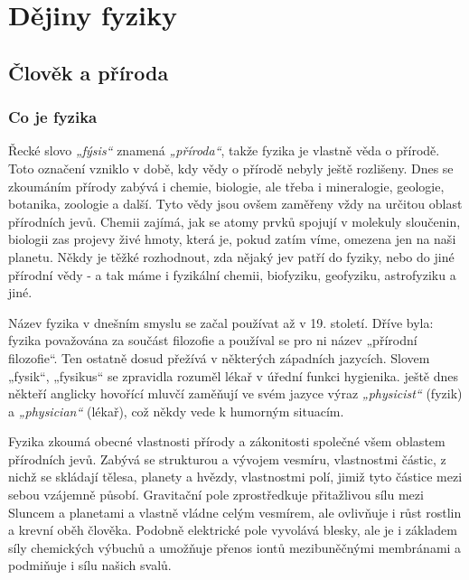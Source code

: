 \setchaptertoc
\chapter{Dějiny fyziky}\label{fyz:IchapII} 
  \section{Člověk a příroda}
    \subsection{Co je fyzika}
      Řecké slovo \emph{„fýsis“} znamená \emph{„příroda“}, takže fyzika je vlastně věda o přírodě.
      Toto označení vzniklo v době, kdy vědy o přírodě nebyly ještě rozlišeny. Dnes se zkoumáním
      přírody zabývá i chemie, biologie, ale třeba i mineralogie, geologie, botanika, zoologie a
      další. Tyto vědy jsou ovšem zaměřeny vždy na určitou oblast přírodních jevů. Chemii zajímá,
      jak se atomy prvků spojují v molekuly sloučenin, biologii zas projevy živé hmoty, která je,
      pokud zatím víme, omezena jen na naši planetu. Někdy je těžké rozhodnout, zda nějaký jev patří
      do fyziky, nebo do jiné přírodní vědy - a tak máme i fyzikální chemii, biofyziku, geofyziku,
      astrofyziku a jiné. 
      
      Název fyzika v dnešním smyslu se začal používat až v 19. století. Dříve byla: fyzika
      považována za součást filozofie a používal se pro ni název „přírodní filozofie“. Ten ostatně
      dosud přežívá v některých západních jazycích. Slovem „fysik“, „fysikus“ se zpravidla rozuměl
      lékař v úřední funkci hygienika. ještě dnes někteří anglicky hovořící mluvčí zaměňují ve svém
      jazyce výraz \emph{„physicist“} (fyzik) a \emph{„physician“} (lékař), což někdy vede k
      humorným situacím. 
      
      Fyzika zkoumá obecné vlastnosti přírody a zákonitosti společné všem oblastem přírodních jevů.
      Zabývá se strukturou a vývojem vesmíru, vlastnostmi částic, z nichž se skládají tělesa,
      planety a hvězdy, vlastnostmi polí, jimiž tyto částice mezi sebou vzájemně působí. Gravitační
      pole zprostředkuje přitažlivou sílu mezi Sluncem a planetami a vlastně vládne celým vesmírem,
      ale ovlivňuje i růst rostlin a krevní oběh člověka. Podobně elektrické pole vyvolává blesky,
      ale je i základem síly chemických výbuchů a umožňuje přenos iontů mezibuněčnými membránami a
      podmiňuje i sílu našich svalů. 

